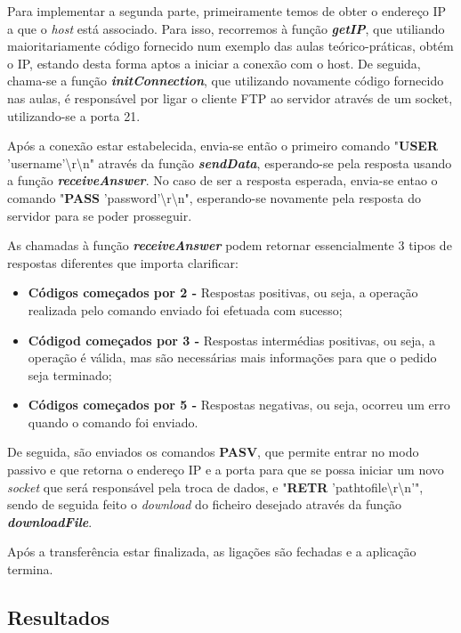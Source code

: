 \documentclass[11pt]{article}
\begin{document}
Para implementar a segunda parte, primeiramente temos de obter o endereço IP a que o \emph{host} está associado. Para isso, recorremos à função \textit{\textbf{getIP}}, que utiliando maioritariamente código fornecido num exemplo das aulas teórico-práticas, obtém o IP, estando desta forma aptos a iniciar a conexão com o host. De seguida, chama-se a função \textit{\textbf{initConnection}}, que utilizando novamente código fornecido nas aulas, é responsável por ligar o cliente FTP ao servidor através de um socket, utilizando-se a porta 21.

Após a conexão estar estabelecida, envia-se então o primeiro comando "\textbf{USER} 'username'\textbackslash r\textbackslash n" através da função \textit{\textbf{sendData}}, esperando-se pela resposta usando a função \textit{\textbf{receiveAnswer}}. No caso de ser a resposta esperada, envia-se entao o comando "\textbf{PASS} 'password'\textbackslash r\textbackslash n", esperando-se novamente pela resposta do servidor para se poder prosseguir.

As chamadas à função \textit{\textbf{receiveAnswer}} podem retornar essencialmente 3 tipos de respostas diferentes que importa clarificar:

\begin{itemize}
    \item \textbf{Códigos começados por 2 -} Respostas positivas, ou seja, a operação realizada pelo comando enviado foi efetuada com sucesso;
    \item \textbf{Códigod começados por 3 -} Respostas intermédias positivas, ou seja, a operação é válida, mas são necessárias mais informações para que o pedido seja terminado;
    \item \textbf{Códigos começados por 5 -} Respostas negativas, ou seja, ocorreu um erro quando o comando foi enviado.
\end{itemize}

De seguida, são enviados os comandos \textbf{PASV}, que permite entrar no modo passivo e que retorna o endereço IP e a porta para que se possa iniciar um novo \emph{socket} que será responsável pela troca de dados, e "\textbf{RETR} 'path\textunderscore to\textunderscore file\textbackslash r\textbackslash n'", sendo de seguida feito o \emph{download} do ficheiro desejado através da função \textit{\textbf{downloadFile}}. 

Após a transferência estar finalizada, as ligações são fechadas e a aplicação termina.

\subsection{Resultados}
\end{document}
